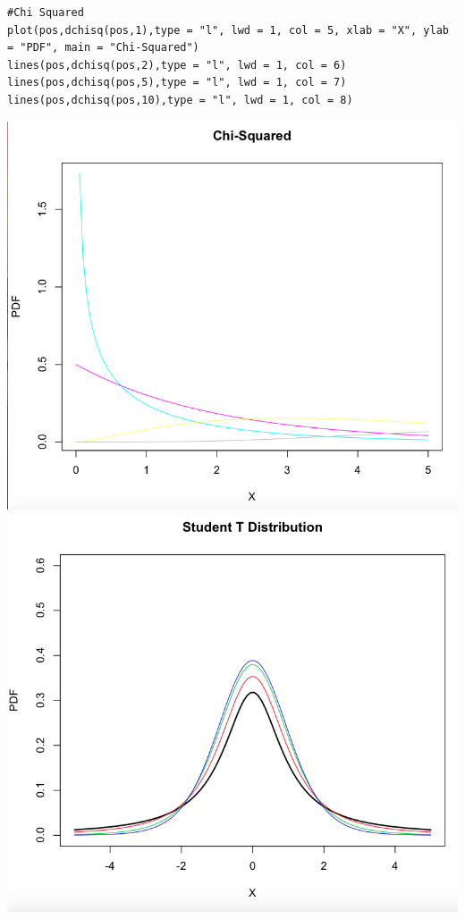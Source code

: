 \documentclass[letterpaper,12pt]{article}
\begin{document}
\begin{enumerate}
\begin{lstlisting}
#Chi Squared
plot(pos,dchisq(pos,1),type = "l", lwd = 1, col = 5, xlab = "X", ylab = "PDF", main = "Chi-Squared")
lines(pos,dchisq(pos,2),type = "l", lwd = 1, col = 6)
lines(pos,dchisq(pos,5),type = "l", lwd = 1, col = 7)
lines(pos,dchisq(pos,10),type = "l", lwd = 1, col = 8)
\end{lstlisting}
\includegraphics[scale = 0.4]{Chi-Squared} \\
\includegraphics[scale = 0.4]{T-Distribution}


\end{enumerate}
\end{document}
